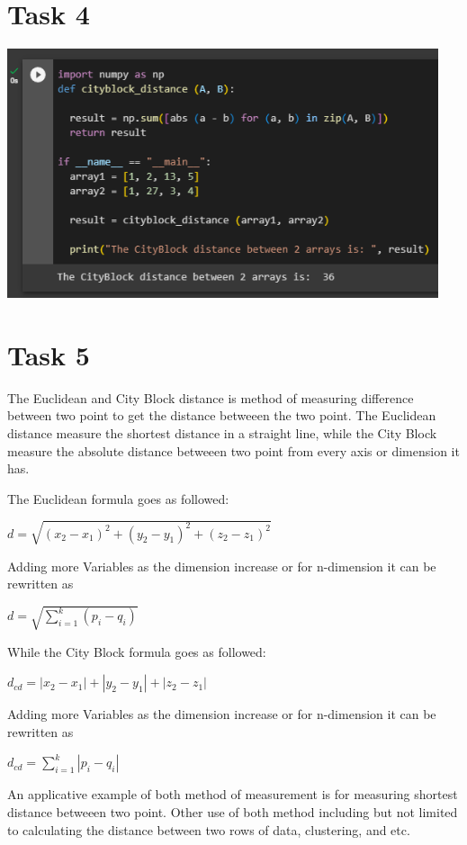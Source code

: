 \documentclass[12pt,titlepage]{article}
\begin{document}
\newpage

\section*{Task 4}

\includegraphics[width=0.95\textwidth]{images/figures/fig2.png}

\newpage

\section*{Task 5}

The Euclidean and City Block distance is method of measuring difference between two point to get the distance betweeen the two point. The Euclidean distance measure the shortest distance in a straight line, while the City Block measure the absolute distance betweeen two point from every axis or dimension it has.

The Euclidean formula goes as followed:
\begin{center}
    $d=\sqrt{(x_2-x_1)^2+(y_2-y_1)^2+(z_2-z_1)^2}$
\end{center}
Adding more Variables as the dimension increase or for n-dimension it can be rewritten as 
\begin{center}
    $d=\sqrt{\sum_{i=1}^{k}(p_i-q_i)}$
\end{center}
While the City Block formula goes as followed: 
\begin{center}
    $d_{cd}=|x_2-x_1|+|y_2-y_1|+|z_2-z_1|$
\end{center}
Adding more Variables as the dimension increase or for n-dimension it can be rewritten as
\begin{center}
    $d_{cd}=\sum_{i=1}^{k}|p_i-q_i|$
\end{center}

An applicative example of both method of measurement is for measuring shortest distance betweeen two point. Other use of both method including but not limited to calculating the distance between two rows of data, clustering, and etc.
\end{document}
